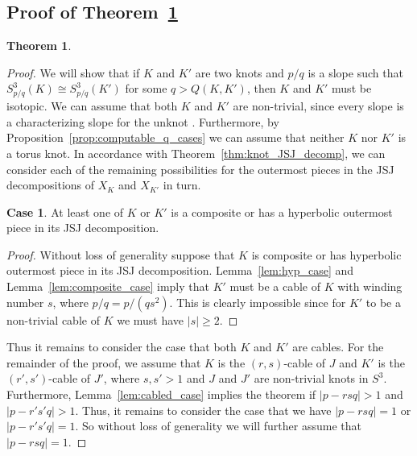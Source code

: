 \documentclass{amsart} %
\theoremstyle{thm}
\newtheorem{thm}[Theorem]{Theorem}
\theoremstyle{definition}
\newtheorem{case}{Case}
\numberwithin{equation}{section}
\begin{document}
\subsection{Proof of Theorem~\ref{thm:computable_q}}
\begin{thm}\label{thm:computable_q}
\computableq
\end{thm}
\begin{proof}
\setcounter{case}{0}
We will show that if $K$ and $K'$ are two knots and $p/q$ is a slope such that $S_{p/q}^3(K)\cong S_{p/q}^3(K')$ for some $q>Q(K,K')$, then $K$ and $K'$ must be isotopic. We can assume that both $K$ and $K'$ are non-trivial, since every slope is a characterizing slope for the unknot \cite{Kronheimer2007lensspacsurgeries}. Furthermore, by Proposition~\ref{prop:computable_q_cases} we can assume that neither $K$ nor $K'$ is a torus knot. In accordance with Theorem~\ref{thm:knot_JSJ_decomp}, we can consider each of the remaining possibilities for the outermost pieces in the JSJ decompositions of $X_K$ and $X_{K'}$ in turn.

\begin{case}
At least one of $K$ or $K'$ is a composite or has a hyperbolic outermost piece in its JSJ decomposition.
\end{case}
\begin{proof}
Without loss of generality suppose that $K$ is composite or has hyperbolic outermost piece in its JSJ decomposition. Lemma~\ref{lem:hyp_case} and Lemma~\ref{lem:composite_case} imply that $K'$ must be a cable of $K$ with winding number $s$, where $p/q=p/(qs^2)$. This is clearly impossible since for $K'$ to be a non-trivial cable of $K$ we must have $|s|\geq 2$.
\end{proof}
Thus it remains to consider the case that both $K$ and $K'$ are cables. For the remainder of the proof, we assume that $K$ is the $(r,s)$-cable of $J$ and $K'$ is the $(r',s')$-cable of $J'$, where $s,s'>1$ and $J$ and $J'$ are non-trivial knots in $S^3$. Furthermore, Lemma~\ref{lem:cabled_case} implies the theorem if $|p-rsq|>1$ and $|p-r's'q|>1$. Thus, it remains to consider the case that we have $|p-rsq|=1$ or $|p-r's'q|=1$. So without loss of generality we will further assume that $|p-rsq|=1$.


\end{proof}
\end{document}
